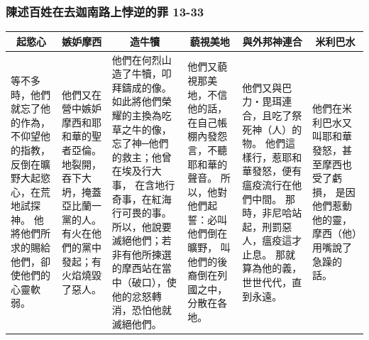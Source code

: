 \subsubsection{陳述百姓在去迦南路上悖逆的罪 13-33}
\begin{table}[H]
\centering
\begin{tabular}{p{2.25cm}|p{2.00cm}|p{4cm}|p{2.5cm}|p{3.00cm}|p{2.00cm}}\hline\hline
\multicolumn{1}{c|}{起慾心}&\multicolumn{1}{c|}{嫉妒摩西}&\multicolumn{1}{c|}{造牛犢}&\multicolumn{1}{c|}{藐視美地}&\multicolumn{1}{c|}{與外邦神連合}&\multicolumn{1}{c}{米利巴水}\\\hline
等不多時，他們就忘了他的作為，不仰望他的指教，
反倒在曠野大起慾心，在荒地試探神。
他將他們所求的賜給他們，卻使他們的心靈軟弱。
&\multirow{1}{2.2cm}{他們又在營中嫉妒摩西和耶和華的聖者亞倫。
地裂開，吞下大坍，掩蓋亞比蘭一黨的人。
有火在他們的黨中發起；有火焰燒毀了惡人。}
&\multirow{1}{4.2cm}{他們在何烈山造了牛犢，叩拜鑄成的像。
如此將他們榮耀的主換為吃草之牛的像，
忘了神─他們的救主；他曾在埃及行大事，
在含地行奇事，在紅海行可畏的事。
所以，他說要滅絕他們；若非有他所揀選的摩西站在當中（破口），使他的忿怒轉消，恐怕他就滅絕他們。}
&\multirow{1}{2.7cm}{他們又藐視那美地，不信他的話，
在自己帳棚內發怨言，不聽耶和華的聲音。
所以，他對他們起誓：必叫他們倒在曠野，
叫他們的後裔倒在列國之中，分散在各地。}
&他們又與巴力‧毘珥連合，且吃了祭死神（人）的物。
他們這樣行，惹耶和華發怒，便有瘟疫流行在他們中間。
那時，非尼哈站起，刑罰惡人，瘟疫這才止息。
那就算為他的義，世世代代，直到永遠。
&他們在米利巴水又叫耶和華發怒，甚至摩西也受了虧損，
是因他們惹動他的靈，摩西（他）用嘴說了急躁的話。
\\\hline
\end{tabular}
\end{table} 



